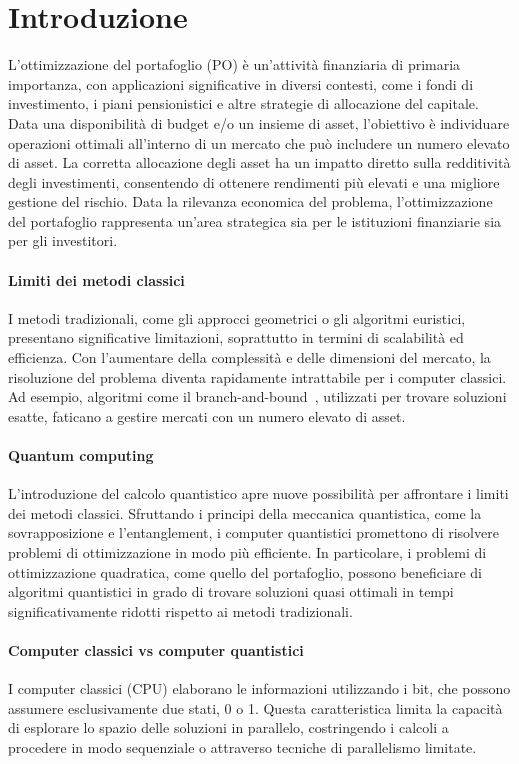 \section{Introduzione}\label{sec:introduction}
L'ottimizzazione del portafoglio (PO) è un'attività finanziaria di primaria 
importanza, con applicazioni significative in diversi contesti, come 
i fondi di investimento, i piani pensionistici e altre strategie di 
allocazione del capitale. Data una disponibilità di budget e/o un 
insieme di asset, l'obiettivo è individuare operazioni ottimali 
all'interno di un mercato che può includere un numero elevato di asset.
La corretta allocazione degli asset ha un impatto diretto sulla 
redditività degli investimenti, consentendo di ottenere rendimenti più 
elevati e una migliore gestione del rischio. Data la rilevanza economica 
del problema, l’ottimizzazione del portafoglio rappresenta un’area 
strategica sia per le istituzioni finanziarie sia per gli investitori.

\paragraph{Limiti dei metodi classici}
I metodi tradizionali, come gli approcci geometrici o gli algoritmi 
euristici, presentano significative limitazioni, soprattutto in termini 
di scalabilità ed efficienza. Con l’aumentare della complessità e delle 
dimensioni del mercato, la risoluzione del problema diventa rapidamente 
intrattabile per i computer classici. Ad esempio, algoritmi come il 
branch-and-bound~\cite{land2010automatic}, utilizzati per trovare soluzioni 
esatte, faticano a gestire mercati con un numero elevato di asset. 

\paragraph{Quantum computing}
L’introduzione del calcolo quantistico apre nuove possibilità per 
affrontare i limiti dei metodi classici. Sfruttando i principi della 
meccanica quantistica, come la sovrapposizione e l’entanglement, i 
computer quantistici promettono di risolvere problemi di ottimizzazione 
in modo più efficiente. In particolare, i problemi di ottimizzazione 
quadratica, come quello del portafoglio, possono beneficiare di 
algoritmi quantistici in grado di trovare soluzioni quasi ottimali in 
tempi significativamente ridotti rispetto ai metodi tradizionali.

\paragraph{Computer classici vs computer quantistici}
I computer classici (CPU) elaborano le informazioni utilizzando i bit, che 
possono assumere esclusivamente due stati, 0 o 1. Questa caratteristica 
limita la capacità di esplorare lo spazio delle soluzioni in parallelo, 
costringendo i calcoli a procedere in modo sequenziale o attraverso 
tecniche di parallelismo limitate.


